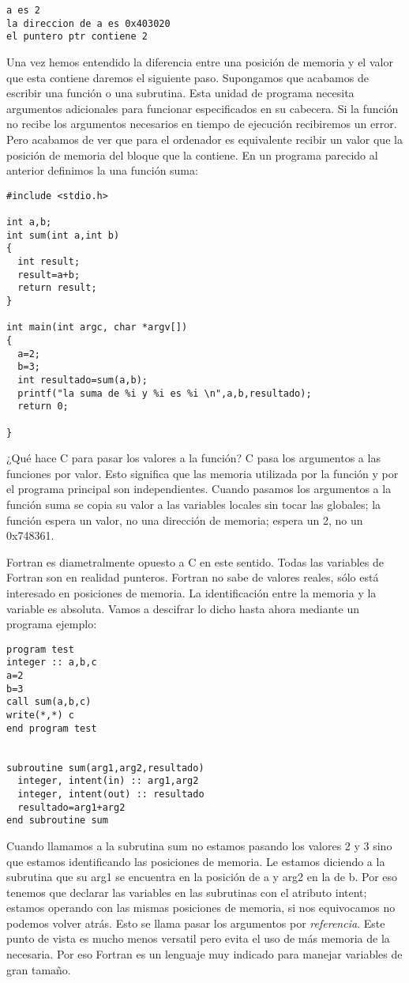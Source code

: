 \begin{verbatim}
a es 2
la direccion de a es 0x403020
el puntero ptr contiene 2
\end{verbatim}

Una vez hemos entendido la diferencia entre una posición de memoria y
el valor que esta contiene daremos el siguiente paso. Supongamos que
acabamos de escribir una función o una subrutina. Esta unidad de
programa necesita argumentos adicionales para funcionar especificados
en su cabecera. Si la función no recibe los argumentos necesarios en
tiempo de ejecución recibiremos un error. Pero acabamos de ver que
para el ordenador es equivalente recibir un valor que la posición de
memoria del bloque que la contiene. En un programa parecido al
anterior definimos la una función suma:

\begin{verbatim}
#include <stdio.h>

int a,b;
int sum(int a,int b)
{ 
  int result;
  result=a+b;
  return result;
}

int main(int argc, char *argv[])
{
  a=2;
  b=3;
  int resultado=sum(a,b);
  printf("la suma de %i y %i es %i \n",a,b,resultado);
  return 0;

}
\end{verbatim}

¿Qué hace C para pasar los valores a la función? C pasa los argumentos
a las funciones por valor. Esto significa que las memoria utilizada
por la función y por el programa principal son independientes. Cuando
pasamos los argumentos a la función suma se copia su valor a las
variables locales sin tocar las globales; la función espera un valor,
no una dirección de memoria; espera un 2, no un 0x748361.

Fortran es diametralmente opuesto a C en este sentido. Todas las
variables de Fortran son en realidad punteros. Fortran no sabe de
valores reales, sólo está interesado en posiciones de memoria. La
identificación entre la memoria y la variable es absoluta. Vamos a
descifrar lo dicho hasta ahora mediante un programa ejemplo:

\begin{verbatim}
program test
integer :: a,b,c
a=2
b=3
call sum(a,b,c)
write(*,*) c
end program test


subroutine sum(arg1,arg2,resultado)
  integer, intent(in) :: arg1,arg2
  integer, intent(out) :: resultado
  resultado=arg1+arg2
end subroutine sum
\end{verbatim}

Cuando llamamos a la subrutina sum no estamos pasando los valores 2 y
3 sino que estamos identificando las posiciones de memoria. Le estamos
diciendo a la subrutina que su arg1 se encuentra en la posición de a y
arg2 en la de b. Por eso tenemos que declarar las variables en las
subrutinas con el atributo intent; estamos operando con las mismas
posiciones de memoria, si nos equivocamos no podemos volver atrás.
Esto se llama pasar los argumentos por \emph{referencia}. Este punto
de vista es mucho menos versatil pero evita el uso de más memoria de
la necesaria. Por eso Fortran es un lenguaje muy indicado para manejar
variables de gran tamaño.

